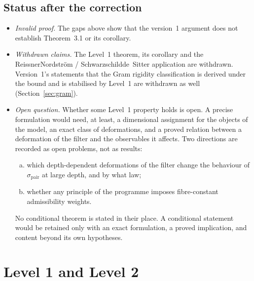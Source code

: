 \documentclass[11pt,a4paper]{article}
\begin{document}
  \subsection{Status after the correction}
  \label{subsec:status}

    \begin{itemize}
      \item \emph{Invalid proof.}
        The gaps above show that the version~1 argument does not establish Theorem~3.1 or its corollary.
      \item \emph{Withdrawn claims.}
        The Level~1 theorem, its corollary and the Reissner\textendash Nordstr\"om /
        Schwarzschild\textendash de~Sitter application are withdrawn.
        Version~1's statements that the Gram rigidity classification is derived under the bound and is
        stabilised by Level~1 are withdrawn as well (Section~\ref{sec:gram}).
      \item \emph{Open question.}
        Whether some Level~1 property holds is open.
        A precise formulation would need, at least, a dimensional assignment for the objects of the model, an
        exact class of deformations, and a proved relation between a deformation of the filter and the
        observables it affects.
        Two directions are recorded as open problems, not as results:
        \begin{enumerate}[(a)]
          \item which depth-dependent deformations of the filter change the behaviour of
            $\sigma_{\mathrm{pair}}$ at large depth, and by what law;
          \item whether any principle of the programme imposes fibre-constant admissibility weights.
        \end{enumerate}
        No conditional theorem is stated in their place.
        A conditional statement would be retained only with an exact formulation, a proved implication, and
        content beyond its own hypotheses.
    \end{itemize}

  \section{Level 1 and Level 2}
  \label{sec:discussion}
\end{document}
